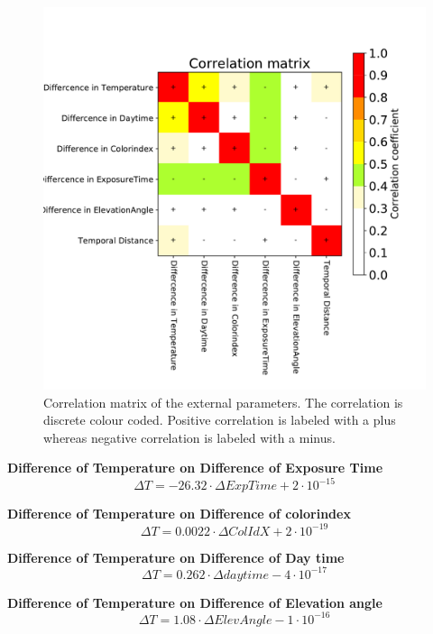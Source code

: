 \documentclass  [
  paper    = a4,
  BCOR     = 10mm,
  twoside,
  fontsize = 12pt,
  fleqn,
  toc      = bibnumbered,
  toc      = listofnumbered,
  numbers  = noendperiod,
  headings = normal,
  listof   = leveldown,
  version  = 3.03
]                                       {scrreprt}
\begin{document}
	\begin{figure}
		\centering
		\includegraphics[width=1\linewidth]{Bilder/varCorrelation_matrix}
		\caption{Correlation matrix of the external parameters. The correlation is discrete colour coded. Positive correlation is labeled with a plus whereas negative correlation is labeled with a minus.}
		\label{fig:varcorrelationmatrix}
	\end{figure}
%
		\textbf{Difference of Temperature on  Difference of Exposure Time}
		\begin{equation}
		\Delta T =  -26.32\cdot \Delta ExpTime + 2\cdot 10^{-15}
		\end{equation}
		
		\textbf{Difference of Temperature on  Difference of colorindex}
		\begin{equation}
		\Delta T = 0.0022\cdot \Delta ColIdX +2\cdot 10^{-19}
		\end{equation}
		
				\textbf{Difference of Temperature on  Difference of Day time}
		\begin{equation}
		\Delta T =0.262\cdot \Delta daytime -4\cdot 10^{-17}
		\end{equation}
		
		\textbf{Difference of Temperature on  Difference of Elevation angle}
		\begin{equation}
		\Delta T =1.08\cdot \Delta Elev Angle -1\cdot 10^{-16}
		\end{equation}
\end{document}
